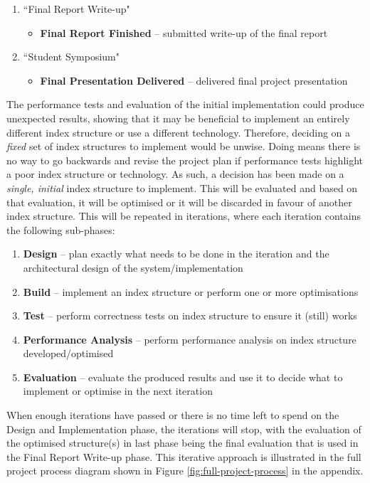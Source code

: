 \begin{enumerate}
\begin{itemize}
	\end{itemize}
	\item ``Final Report Write-up"
	\begin{itemize}
		\item \textbf{Final Report Finished} -- submitted write-up of the final report
	\end{itemize}
	\item ``Student Symposium"
	\begin{itemize}
		\item \textbf{Final Presentation Delivered} -- delivered final project presentation
	\end{itemize}
\end{enumerate}

The performance tests and evaluation of the initial implementation could produce unexpected results, showing that it may be beneficial to implement an entirely different index structure or use a different technology. Therefore, deciding on a \textit{fixed} set of index structures to implement  would be unwise. Doing means there is no way to go backwards and revise the project plan if performance tests highlight a poor index structure or technology. As such, a decision has been made on a \textit{single, initial} index structure to implement. This will be evaluated and based on that evaluation, it will be optimised or it will be discarded in favour of another index structure. This will be repeated in iterations, where each iteration contains the following sub-phases:
\begin{enumerate}
	\item \textbf{Design} -- plan exactly what needs to be done in the iteration and the architectural design of the system/implementation
	\item \textbf{Build} -- implement an index structure or perform one or more optimisations
	\item \textbf{Test} -- perform correctness tests on index structure to ensure it (still) works
	\item \textbf{Performance Analysis} -- perform performance analysis on index structure developed/optimised
	\item \textbf{Evaluation} -- evaluate the produced results and use it to decide what to implement or optimise in the next iteration
\end{enumerate}
When enough iterations have passed or there is no time left to spend on the Design and Implementation phase, the iterations will stop, with the evaluation of the optimised structure(s) in last phase being the final evaluation that is used in the Final Report Write-up phase. This iterative approach is illustrated in the full project process diagram shown in Figure \ref{fig:full-project-process} in the appendix.

